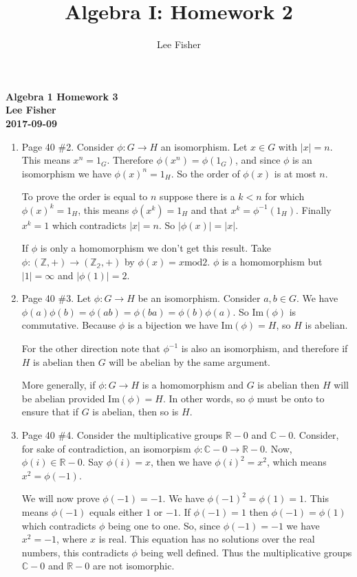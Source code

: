 \documentclass[12pt]{report}
\title{\textbf{Algebra I: Homework 2}}
\author{Lee Fisher}
\date{}
\begin{document}
\textbf{Algebra 1 Homework 3}\\
\indent \textbf{Lee Fisher}\\
\indent \textbf{2017-09-09}

\begin{enumerate}

\item Page 40 \#2. Consider $\phi: G \to H$ an isomorphism. Let $x \in G$ with
      $|x| = n$. This means $x^n=1_G$. Therefore $\phi(x^n) = \phi(1_G)$, and
      since $\phi$ is an isomorphism we have $\phi(x)^n = 1_H$. So the order of
      $\phi(x)$ is at most $n$.

      To prove the order is equal to $n$ suppose there is a $k<n$ for which
      $\phi(x)^k = 1_H$, this means $\phi(x^k) = 1_H$ and that $x^k =
      \phi^{-1}(1_H)$. Finally $x^k = 1$ which contradicts $|x|=n$. So
      $|\phi(x)| = |x|$.

      If $\phi$ is only a homomorphism we don't get this result. Take
      $\phi:(\mathbb{Z},+) \to (\mathbb{Z_2},+)$ by $\phi(x) = x \textrm{mod}2$.
      $\phi$ is a homomorphism but $|1| = \infty$ and $|\phi(1)| = 2$.\\

\item Page 40 \#3. Let $\phi: G \to H$ be an isomorphism. Consider $a,b \in G$.
      We have $\phi(a)\phi(b) = \phi(ab) = \phi(ba) = \phi(b)\phi(a)$. So
      $\textrm{Im}(\phi)$ is commutative. Because $\phi$ is a bijection we have
      $\textrm{Im}(\phi) = H$, so $H$ is abelian.

      For the other direction note that $\phi^{-1}$ is also an isomorphism, and
      therefore if $H$ is abelian then $G$ will be abelian by the same argument.

      More generally, if $\phi:G \to H$ is a homomorphism and $G$ is abelian
      then $H$ will be abelian provided $\textrm{Im}(\phi) = H$. In other words,
      so $\phi$ must be onto to ensure that if $G$ is abelian, then so is $H$.\\

\item Page 40 \#4. Consider the multiplicative groups $\mathbb{R}-{0}$ and
      $\mathbb{C}-{0}$. Consider, for sake of contradiction, an isomorpism
      $\phi: \mathbb{C}-{0} \to \mathbb{R}-{0}$. Now, $\phi(i) \in
      \mathbb{R}-{0}$. Say $\phi(i) = x$, then we have $\phi(i)^2 = x^2$, which
      means $x^2 = \phi(-1)$.

      We will now prove $\phi(-1) = -1$. We have $\phi(-1)^2 = \phi(1) = 1$.
      This means $\phi(-1)$ equals either $1$ or $-1$. If $\phi(-1) = 1$ then
      $\phi(-1) = \phi(1)$ which contradicts $\phi$ being one to one. So, since
      $\phi(-1) = -1$ we have $x^2 = -1$, where $x$ is real. This equation has
      no solutions over the real numbers, this contradicts $\phi$ being well
      defined. Thus the multiplicative groups $\mathbb{C} -{0}$ and
      $\mathbb{R} -{0}$ are not isomorphic.\\


\end{enumerate}
\end{document}
